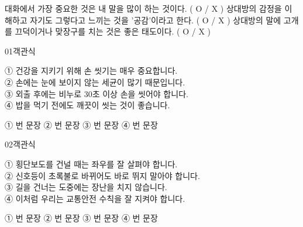 \documentclass[fs12,seriesSau]{korfarm-base}
\begin{document}
\kfActivityBg \par{}\par\nopagebreak[4]\smallskip\nopagebreak[4]
\begin{kfOXList}
\kfOXItem 대화에서 가장 중요한 것은 내 말을 많이 하는 것이다. ( O / X ) \kfOX
\kfOXItem 상대방의 감정을 이해하고 자기도 그렇다고 느끼는 것을 '공감'이라고 한다. ( O / X ) \kfOX
\kfOXItem 상대방의 말에 고개를 끄덕이거나 맞장구를 치는 것은 좋은 태도이다. ( O / X ) \kfOX
\end{kfOXList}


\begin{kfQBlock}{01}{객관식}
\begin{kfEvidence}① 건강을 지키기 위해 손 씻기는 매우 중요합니다.  \\\relax
 ② 손에는 눈에 보이지 않는 세균이 많기 때문입니다.  \\\relax
 ③ 외출 후에는 비누로 30초 이상 손을 씻어야 합니다.  \\\relax
④ 밥을 먹기 전에도 깨끗이 씻는 것이 좋습니다.\end{kfEvidence}
\begin{kfChoices}
\kfChoice ① 번 문장
\kfChoice ② 번 문장
\kfChoice ③ 번 문장
\kfChoice ④ 번 문장
\end{kfChoices}
\end{kfQBlock}
\begin{kfQBlock}{02}{객관식}
\begin{kfEvidence}① 횡단보도를 건널 때는 좌우를 잘 살펴야 합니다.  \\\relax
 ② 신호등이 초록불로 바뀌어도 바로 뛰지 말아야 합니다.  \\\relax
 ③ 길을 건너는 도중에는 장난을 치지 않습니다.  \\\relax
④ 이처럼 우리는 교통안전 수칙을 잘 지켜야 합니다.\end{kfEvidence}
\begin{kfChoices}
\kfChoice ① 번 문장
\kfChoice ② 번 문장
\kfChoice ③ 번 문장
\kfChoice ④ 번 문장
\end{kfChoices}
\end{kfQBlock}


\end{document}
